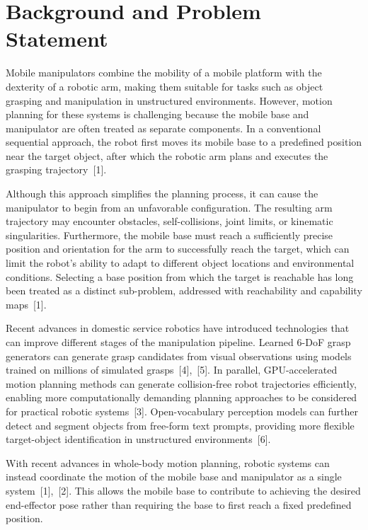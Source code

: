 \documentclass[12pt,a4paper]{article}
\begin{document}
\setcounter{page}{1}

\section*{Background and Problem Statement}

Mobile manipulators combine the mobility of a mobile platform with the dexterity of a robotic arm, making them suitable for tasks such as object grasping and manipulation in
unstructured environments. However, motion planning for these systems is challenging because
the mobile base and manipulator are often treated as separate components. In a conventional
sequential approach, the robot first moves its mobile base to a predefined position near the
target object, after which the robotic arm plans and executes the grasping trajectory~[1].

Although this approach simplifies the planning process, it can cause the manipulator to
begin from an unfavorable configuration. The resulting arm trajectory may encounter obstacles,
self-collisions, joint limits, or kinematic singularities. Furthermore, the mobile base must reach a
sufficiently precise position and orientation for the arm to successfully reach the target, which
can limit the robot's ability to adapt to different object locations and environmental conditions.
Selecting a base position from which the target is reachable has long been treated as a distinct
sub-problem, addressed with reachability and capability maps~[1].

Recent advances in domestic service robotics have introduced technologies that can
improve different stages of the manipulation pipeline. Learned 6-DoF grasp generators can
generate grasp candidates from visual observations using models trained on millions of
simulated grasps~[4],~[5]. In parallel, GPU-accelerated motion planning methods can generate
collision-free robot trajectories efficiently, enabling more computationally demanding planning
approaches to be considered for practical robotic systems~[3]. Open-vocabulary perception
models can further detect and segment objects from free-form text prompts, providing more
flexible target-object identification in unstructured environments~[6].

With recent advances in whole-body motion planning, robotic systems can instead
coordinate the motion of the mobile base and manipulator as a single system~[1],~[2]. This
allows the mobile base to contribute to achieving the desired end-effector pose rather than
requiring the base to first reach a fixed predefined position.
\end{document}
